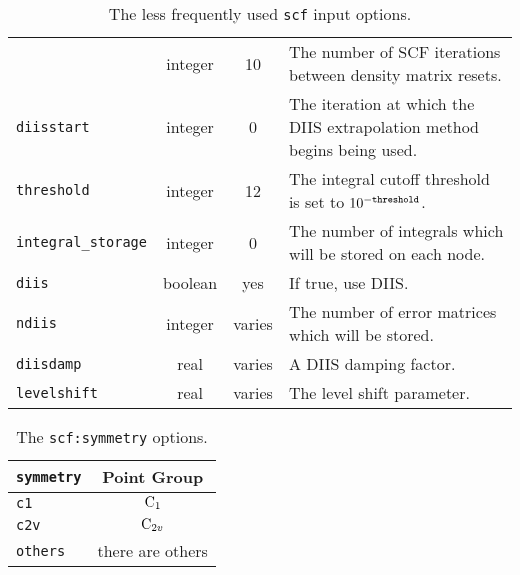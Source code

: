 \begin{table}
\begin{tabular}{|lccp{2.75in}|}
          &integer& 10 & The number of SCF iterations
                                         between density matrix resets. \\
  {\tt diisstart}         &integer&  0 & The iteration at which the DIIS
                                         extrapolation method begins being
                                         used. \\
  {\tt threshold}         &integer& 12 & The integral cutoff threshold is
                                         set to $10^{-{\tt threshold}}$. \\
  {\tt integral\_storage} &integer&  0 & The number of integrals which
                                         will be stored on each node. \\
  {\tt diis}              &boolean&yes & If true, use DIIS. \\
  {\tt ndiis}             &integer&varies& The number of error matrices
                                         which will be stored. \\
  {\tt diisdamp}          &real&varies& A DIIS damping factor. \\
  {\tt levelshift}        &real&varies& The level shift parameter. \\
\hline
\end{tabular}
\caption{The less frequently used {\tt scf} input options.}
\label{scfinputb}
\end{table}

\begin{table}
\centering
\begin{tabular}{|lc|}
\hline
\multicolumn{1}{|c}{\tt symmetry} & \multicolumn{1}{c|}{Point Group} \\
\hline
  {\tt c1}   & $ {\rm C}_1 $ \\
  {\tt c2v}   & $ {\rm C}_{2v} $ \\
  {\tt others} & there are others \\
\hline
\end{tabular}
\caption{The {\tt scf:symmetry} options.}
\label{symmetry}
\end{table}

